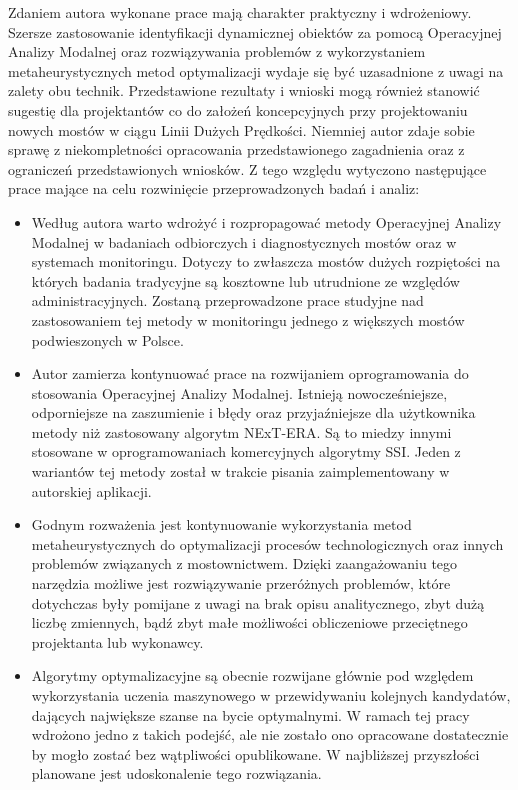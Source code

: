 Zdaniem autora wykonane prace mają charakter praktyczny i wdrożeniowy. Szersze zastosowanie identyfikacji dynamicznej obiektów za pomocą Operacyjnej Analizy Modalnej oraz rozwiązywania problemów z wykorzystaniem metaheurystycznych metod optymalizacji wydaje się być uzasadnione z uwagi na zalety obu technik. Przedstawione rezultaty i wnioski mogą również stanowić sugestię dla projektantów co do założeń koncepcyjnych przy projektowaniu nowych mostów w ciągu Linii Dużych Prędkości. Niemniej autor zdaje sobie sprawę z niekompletności opracowania przedstawionego zagadnienia oraz z ograniczeń przedstawionych wniosków. Z tego względu wytyczono następujące prace mające na celu rozwinięcie przeprowadzonych badań i analiz:
\begin{itemize}
	\item Według autora warto wdrożyć i rozpropagować metody Operacyjnej Analizy Modalnej w badaniach odbiorczych i diagnostycznych mostów oraz w systemach monitoringu. Dotyczy to zwłaszcza mostów dużych rozpiętości na których badania tradycyjne są kosztowne lub utrudnione ze względów administracyjnych. Zostaną przeprowadzone prace studyjne nad zastosowaniem tej metody w monitoringu jednego z większych mostów podwieszonych w Polsce.
	\item Autor zamierza kontynuować prace na rozwijaniem oprogramowania do stosowania Operacyjnej Analizy Modalnej. Istnieją nowocześniejsze, odporniejsze na zaszumienie i błędy oraz przyjaźniejsze dla użytkownika metody niż zastosowany algorytm NExT-ERA. Są to miedzy innymi stosowane w oprogramowaniach komercyjnych algorytmy SSI. Jeden z wariantów tej metody został w trakcie pisania zaimplementowany w autorskiej aplikacji.
	\item Godnym rozważenia jest kontynuowanie wykorzystania metod metaheurystycznych do optymalizacji procesów technologicznych oraz innych problemów związanych z mostownictwem. Dzięki zaangażowaniu tego narzędzia możliwe jest rozwiązywanie przeróżnych problemów, które dotychczas były pomijane z uwagi na brak opisu analitycznego, zbyt dużą liczbę zmiennych, bądź zbyt małe możliwości obliczeniowe przeciętnego projektanta lub wykonawcy.
	\item  Algorytmy optymalizacyjne są obecnie rozwijane głównie pod względem wykorzystania uczenia maszynowego w przewidywaniu kolejnych kandydatów, dających największe szanse na bycie optymalnymi. W ramach tej pracy wdrożono jedno z takich podejść, ale nie zostało ono opracowane dostatecznie by mogło zostać bez wątpliwości opublikowane. W najbliższej przyszłości planowane jest udoskonalenie tego rozwiązania.
\end{itemize}  

